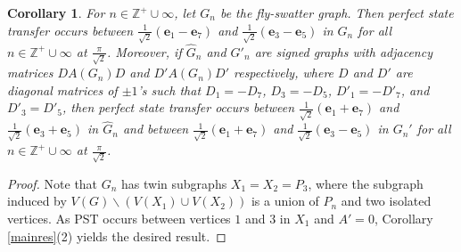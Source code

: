 \documentclass[12pt,a4paper]{article}
\newtheorem{cor}{Corollary}
\def \e {{\bf e}}
\def \e {{\mathbf e}}
\begin{document}
\begin{cor}
\label{fsg}
For $n\in\mathbb{Z}^+\cup{\infty}$, let $G_n$ be the fly-swatter graph. Then perfect state transfer occurs between $\frac{1}{\sqrt{2}}(\e_1-\e_7)$ and $\frac{1}{\sqrt{2}}(\e_3-\e_5)$ in $G_n$ for all $n\in\mathbb{Z}^+\cup{\infty}$ at $\frac{\pi}{\sqrt{2}}$. Moreover, if $\hat{G}_n$ and $G'_n$ are signed graphs with adjacency matrices $DA(G_n)D$ and $D'A(G_n)D'$ respectively, where $D$ and $D'$ are diagonal matrices of $\pm 1$'s such that $D_1=-D_7$, $D_3=-D_5$, $D'_1=-D'_7$, and $D'_3=D'_5$, then perfect state transfer occurs between $\frac{1}{\sqrt{2}}(\e_1+\e_7)$ and $\frac{1}{\sqrt{2}}(\e_3+\e_5)$ in $\hat{G}_n$ and between $\frac{1}{\sqrt{2}}(\e_1+\e_7)$ and $\frac{1}{\sqrt{2}}(\e_3-\e_5)$ in $G_n'$ for all $n\in\mathbb{Z}^+\cup{\infty}$ at $\frac{\pi}{\sqrt{2}}$.
\end{cor}

\begin{proof}
Note that $G_n$ has twin subgraphs $X_1=X_2=P_3$, where the subgraph induced by $V(G)\backslash (V(X_1)\cup V(X_2))$ is a union of $P_n$ and two isolated vertices. As PST occurs between vertices $1$ and $3$ in $X_1$ and $A'=0$, Corollary \ref{mainres}(2) yields the desired result.
\end{proof}
\end{document}
